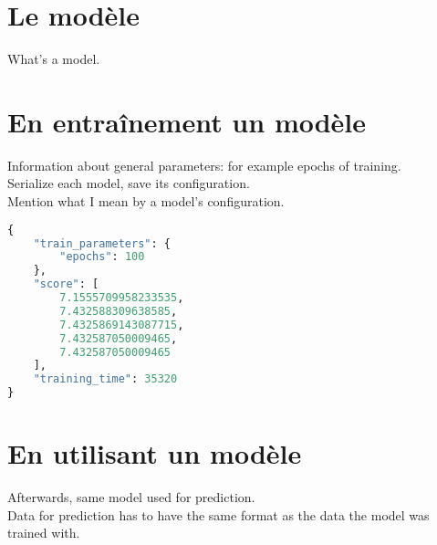 \section{Le modèle}
What's a model.\\

\section{En entraînement un modèle}
Information about general parameters: for example epochs of training.\\
Serialize each model, save its configuration.\\
Mention what I mean by a model's configuration.\\

\begin{lstlisting}[language=python, caption=Example of a model's configuration]
{
    "train_parameters": {
        "epochs": 100
    },
    "score": [
        7.1555709958233535,
        7.432588309638585,
        7.4325869143087715,
        7.432587050009465,
        7.432587050009465
    ],
    "training_time": 35320
}
\end{lstlisting}

\section{En utilisant un modèle}
Afterwards, same model used for prediction.\\
Data for prediction has to have the same format as the data the model was trained with.\\ 
